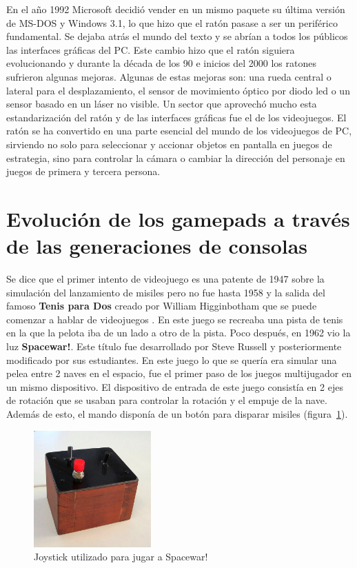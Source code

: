 En el a\~no 1992 Microsoft decidi\'o vender en un mismo paquete su \'ultima versi\'on de MS-DOS y Windows 3.1, lo que hizo que el rat\'on pasase a ser un perif\'erico fundamental. Se dejaba atr\'as el mundo del texto y se abr\'ian a todos los p\'ublicos las interfaces gr\'aficas del PC. Este cambio hizo que el rat\'on siguiera evolucionando y durante la d\'ecada de los 90 e inicios del 2000 los ratones sufrieron algunas mejoras. Algunas de estas mejoras son: una rueda central o lateral para el desplazamiento, el sensor de movimiento \'optico por diodo led o un sensor basado en un l\'aser no visible. Un sector que aprovech\'o mucho esta estandarizaci\'on del rat\'on y de las interfaces gr\'aficas fue el de los videojuegos. El rat\'on se ha convertido en una parte esencial del mundo de los videojuegos de PC, sirviendo no solo para seleccionar y accionar objetos en pantalla en juegos de estrategia, sino para controlar la c\'amara o cambiar la direcci\'on del personaje en juegos de primera y tercera persona.\\


\section{Evoluci\'on de los gamepads a trav\'es de las generaciones de consolas}

Se dice que el primer intento de videojuego es una patente de 1947 sobre la simulaci\'on del lanzamiento de misiles pero no fue hasta 1958 y la salida del famoso \textbf{Tenis para Dos} creado por William Higginbotham que se puede comenzar a hablar de videojuegos \citep{tenispara2}. En este juego se recreaba una pista de tenis en la que la pelota iba de un lado a otro de la pista. Poco despu\'es, en 1962 vio la luz \textbf{Spacewar!}. Este t\'itulo fue desarrollado por Steve Russell y posteriormente modificado por sus estudiantes. En este juego lo que se quer\'ia era simular una pelea entre 2 naves en el espacio, fue el primer paso de los juegos multijugador en un mismo dispositivo. El dispositivo de entrada de este juego consist\'ia en 2 ejes de rotaci\'on que se usaban para controlar la rotaci\'on y el empuje de la nave. Adem\'as de esto, el mando dispon\'ia de un bot\'on para disparar misiles (figura~\ref{Fig:spacewar}).\\


\begin{figure}[t]
\centering
\includegraphics[width=0.4\textwidth]{./Imagenes/Bitmap/spacewar-controller.jpg}
\caption{Joystick utilizado para jugar a Spacewar!}
\label{Fig:spacewar}
\end{figure}

